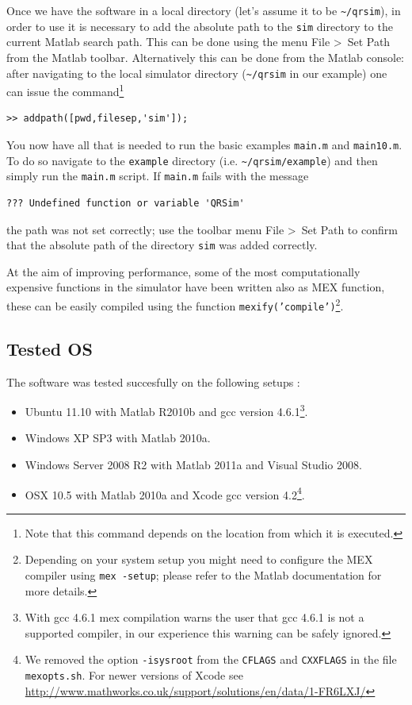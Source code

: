 \documentclass[a4paper,11pt]{report}
\begin{document}
Once we have the software in a local directory (let's assume it to be \texttt{\textasciitilde/qrsim}), in order to use it is necessary to add the absolute path to the \texttt{sim} directory to the current Matlab search path. 
This can be done using the menu \textsf{File \textgreater ~Set Path} from the Matlab toolbar. Alternatively this can be done from the Matlab console: after navigating to the local simulator directory (\texttt{\textasciitilde/qrsim} in our example) one can issue the command\footnote{Note that this command depends on the location from which it is executed.} 
\begin{verbatim}
>> addpath([pwd,filesep,'sim']);
\end{verbatim} 

You now have all that is needed to run the basic examples \texttt{main.m} and \texttt{main10.m}. 
To do so navigate to the \texttt{example} directory (i.e. \texttt{\textasciitilde/qrsim/example}) and then simply run the \texttt{main.m} script.
If \texttt{main.m} fails with the message 
\begin{verbatim}??? Undefined function or variable 'QRSim'\end{verbatim}
the path was not set correctly; use the toolbar menu \textsf{File \textgreater ~Set Path} to confirm that the absolute path of the directory \texttt{sim} was added correctly.

At the aim of improving performance, some of the most computationally expensive functions in the simulator have been written also as MEX function, these can be easily compiled using the function \texttt{mexify('compile')}\footnote{Depending on your system setup you might need to configure the MEX compiler using \texttt{mex -setup}; please refer to the Matlab documentation for more details.}.

\subsection{Tested OS} \label{sec:testedos}

The software was tested succesfully on the following setups :
\begin{itemize}
 \item Ubuntu 11.10 with Matlab R2010b and gcc version 4.6.1\footnote{With gcc 4.6.1 mex compilation warns the user that gcc 4.6.1 is not a supported compiler, in our experience this warning can be safely ignored.}.
 \item Windows XP SP3 with Matlab 2010a.
 \item Windows Server 2008 R2 with Matlab 2011a and Visual Studio 2008.
 \item OSX 10.5 with Matlab 2010a and Xcode gcc version 4.2\footnote{We removed the option \texttt{-isysroot} from the \texttt{CFLAGS} and \texttt{CXXFLAGS} in the file \texttt{mexopts.sh}. For newer versions of Xcode see \url{http://www.mathworks.co.uk/support/solutions/en/data/1-FR6LXJ/}}.
\end{itemize}
\end{document}
